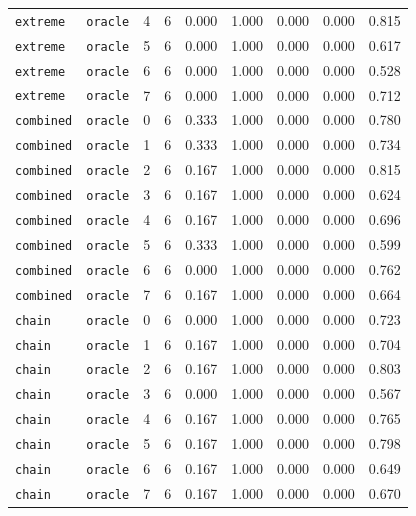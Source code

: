\documentclass{article}
\begin{document}
\begin{center}
\begin{tabular}{lllcccccc}
\texttt{extreme} & \texttt{oracle} & 4 & 6 & 0.000 & 1.000 & 0.000 & 0.000 & 0.815 \\
\texttt{extreme} & \texttt{oracle} & 5 & 6 & 0.000 & 1.000 & 0.000 & 0.000 & 0.617 \\
\texttt{extreme} & \texttt{oracle} & 6 & 6 & 0.000 & 1.000 & 0.000 & 0.000 & 0.528 \\
\texttt{extreme} & \texttt{oracle} & 7 & 6 & 0.000 & 1.000 & 0.000 & 0.000 & 0.712 \\
\texttt{combined} & \texttt{oracle} & 0 & 6 & 0.333 & 1.000 & 0.000 & 0.000 & 0.780 \\
\texttt{combined} & \texttt{oracle} & 1 & 6 & 0.333 & 1.000 & 0.000 & 0.000 & 0.734 \\
\texttt{combined} & \texttt{oracle} & 2 & 6 & 0.167 & 1.000 & 0.000 & 0.000 & 0.815 \\
\texttt{combined} & \texttt{oracle} & 3 & 6 & 0.167 & 1.000 & 0.000 & 0.000 & 0.624 \\
\texttt{combined} & \texttt{oracle} & 4 & 6 & 0.167 & 1.000 & 0.000 & 0.000 & 0.696 \\
\texttt{combined} & \texttt{oracle} & 5 & 6 & 0.333 & 1.000 & 0.000 & 0.000 & 0.599 \\
\texttt{combined} & \texttt{oracle} & 6 & 6 & 0.000 & 1.000 & 0.000 & 0.000 & 0.762 \\
\texttt{combined} & \texttt{oracle} & 7 & 6 & 0.167 & 1.000 & 0.000 & 0.000 & 0.664 \\
\texttt{chain} & \texttt{oracle} & 0 & 6 & 0.000 & 1.000 & 0.000 & 0.000 & 0.723 \\
\texttt{chain} & \texttt{oracle} & 1 & 6 & 0.167 & 1.000 & 0.000 & 0.000 & 0.704 \\
\texttt{chain} & \texttt{oracle} & 2 & 6 & 0.167 & 1.000 & 0.000 & 0.000 & 0.803 \\
\texttt{chain} & \texttt{oracle} & 3 & 6 & 0.000 & 1.000 & 0.000 & 0.000 & 0.567 \\
\texttt{chain} & \texttt{oracle} & 4 & 6 & 0.167 & 1.000 & 0.000 & 0.000 & 0.765 \\
\texttt{chain} & \texttt{oracle} & 5 & 6 & 0.167 & 1.000 & 0.000 & 0.000 & 0.798 \\
\texttt{chain} & \texttt{oracle} & 6 & 6 & 0.167 & 1.000 & 0.000 & 0.000 & 0.649 \\
\texttt{chain} & \texttt{oracle} & 7 & 6 & 0.167 & 1.000 & 0.000 & 0.000 & 0.670 \\
\bottomrule
\end{tabular}
\end{center}
\end{document}
